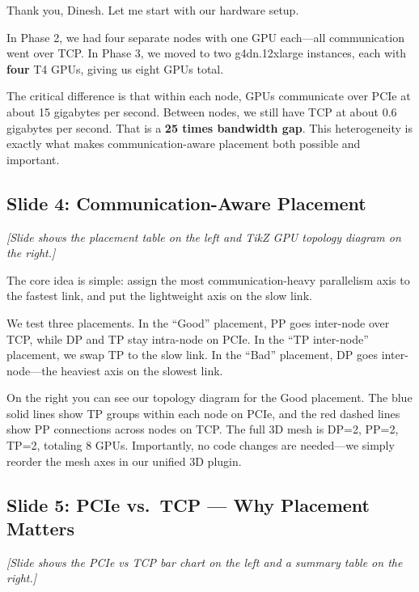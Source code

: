 \documentclass[11pt, a4paper]{article}
\begin{document}
Thank you, Dinesh. Let me start with our hardware setup.

In Phase 2, we had four separate nodes with one GPU each---all communication went over TCP. In Phase 3, we moved to two g4dn.12xlarge instances, each with \textbf{four} T4 GPUs, giving us eight GPUs total.

The critical difference is that within each node, GPUs communicate over PCIe at about 15 gigabytes per second. Between nodes, we still have TCP at about 0.6 gigabytes per second. That is a \textbf{25 times bandwidth gap}. This heterogeneity is exactly what makes communication-aware placement both possible and important.

\subsection{Slide 4: Communication-Aware Placement}
\textit{[Slide shows the placement table on the left and TikZ GPU topology diagram on the right.]}

The core idea is simple: assign the most communication-heavy parallelism axis to the fastest link, and put the lightweight axis on the slow link.

We test three placements. In the ``Good'' placement, PP goes inter-node over TCP, while DP and TP stay intra-node on PCIe. In the ``TP inter-node'' placement, we swap TP to the slow link. In the ``Bad'' placement, DP goes inter-node---the heaviest axis on the slowest link.

On the right you can see our topology diagram for the Good placement. The blue solid lines show TP groups within each node on PCIe, and the red dashed lines show PP connections across nodes on TCP. The full 3D mesh is DP=2, PP=2, TP=2, totaling 8 GPUs. Importantly, no code changes are needed---we simply reorder the mesh axes in our unified 3D plugin.

\subsection{Slide 5: PCIe vs.\ TCP --- Why Placement Matters}
\textit{[Slide shows the PCIe vs TCP bar chart on the left and a summary table on the right.]}
\end{document}
